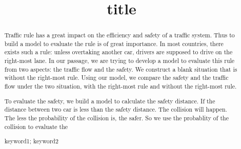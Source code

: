 \documentclass[a4paper, 11pt]{article}
\title{title}
\begin{document}
\begin{abstract}
Traffic rule has a great impact on the efficiency and safety of a traffic system. Thus to build a model to evaluate the rule is of great importance. In most countries, there exists such a rule: unless overtaking another car, drivers are supposed to drive on the right-most lane. In our passage, we are trying to develop a model to evaluate this rule from two aspects: the traffic flow and the safety.
We construct a blank situation that is without the right-most rule. Using our model, we compare the safety and the traffic flow under the two situation, with the right-most rule and without the right-most rule.

To evaluate the safety, we build a model to calculate the safety distance. If the distance between two car is less than the safety distance. The collision will happen. The less the probability of the collision is, the safer. So we use the probablity of the collision to evaluate the

\begin{keywords}
keyword1; keyword2
\end{keywords}
\end{abstract}
\maketitle
\pagestyle{empty}
\newpage
\tableofcontents
\newpage
\pagestyle{fancy}

\end{document}
